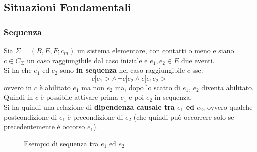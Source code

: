 \documentclass[a4paper,12pt, oneside]{book}
\begin{document}
\subsection{Situazioni Fondamentali}
\subsubsection{Sequenza}
\begin{definizione}
  Sia $\Sigma = (B,E,F;c_{in})$ un sistema elementare, con contatti o meno
  e siano $c\in C_\Sigma$ un caso raggiungibile dal caso iniziale e $e_1,e_2\in
  E$ due eventi.\\
  Si ha che $e_1$ ed $e_2$ sono \textbf{in sequenza} nel caso
  raggiungibile $c$ sse:
  \[c[e_1>\wedge\, \neg c[e_2\wedge c[e_1e_2>\]
  ovvero in $c$ è abilitato $e_1$ ma non $e_2$ ma, dopo lo scatto di $e_1$,
  $e_2$ diventa abilitato. Quindi in $c$ è possibile attivare prima $e_1$ e poi
  $e_2$ in sequenza.\\
  Si ha quindi una relazione di \textbf{dipendenza causale tra $e_1$ ed $e_2$},
  ovvero qualche postcondizione di $e_1$ è precondizione di $e_2$ (che quindi
  può occorrere solo se precedentemente è occorso $e_1$).
  \begin{figure}[H]
    \centering
    \caption{Esempio di sequenza tra $e_1$ ed $e_2$}
  \end{figure}
\end{definizione}
\end{document}
